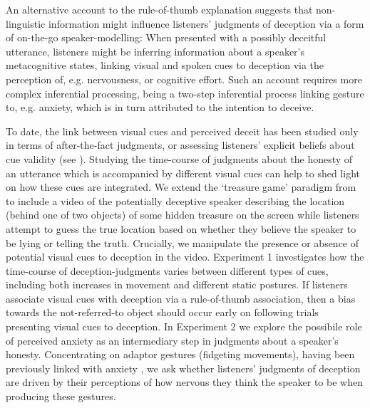 \documentclass[a4paper,man,natbib]{apa6}
\begin{document}
An alternative account to the rule-of-thumb explanation suggests that non-linguistic information might influence listeners' judgments of deception via a form of on-the-go speaker-modelling: 
When presented with a possibly deceitful utterance, listeners might be inferring information about a speaker's metacognitive states, linking visual and spoken cues to deception via the perception of, e.g. nervousness, or cognitive effort. 
Such an account requires more complex inferential processing, being a two-step inferential process linking gesture to, e.g. anxiety, which is in turn attributed to the intention to deceive.

To date, the link between visual cues and perceived deceit has been studied only in terms of after-the-fact judgments, or assessing listeners' explicit beliefs about cue validity (see \citealt{Vrij1996a, Zuckerman1981a}).
Studying the time-course of judgments about the honesty of an utterance which is accompanied by different visual cues can help to shed light on how these cues are integrated.
We extend the `treasure game' paradigm from \citet{Loy2017} to include a video of the potentially deceptive speaker describing the location (behind one of two objects) of some hidden treasure on the screen while listeners attempt to guess the true location based on whether they believe the speaker to be lying or telling the truth. 
Crucially, we manipulate the presence or absence of potential visual cues to deception in the video.
Experiment 1 investigates how the time-course of deception-judgments varies between different types of cues, including both increases in movement and different static postures.
If listeners associate visual cues with deception via a rule-of-thumb association, then a bias towards the not-referred-to object should occur early on following trials presenting visual cues to deception.
In Experiment 2 we explore the possibile role of perceived anxiety as an intermediary step in judgments about a speaker's honesty.
Concentrating on adaptor gestures (fidgeting movements), having been previously linked with anxiety \citep{Gregersen2005}, we ask whether listeners' judgments of deception are driven by their perceptions of how nervous they think the speaker to be when producing these gestures.
\end{document}
